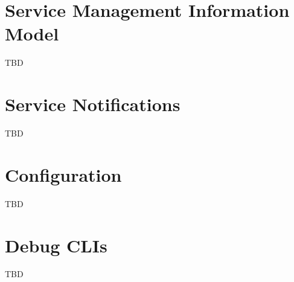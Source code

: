 \begin{flushleft}
\chapter{Service Management Information Model}
TBD

\chapter{Service Notifications}
TBD

\chapter{Configuration}
TBD


\chapter{Debug CLIs}
TBD

\end{flushleft}